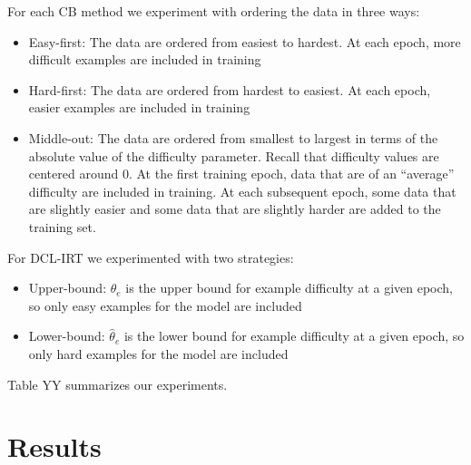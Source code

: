 \documentclass[letterpaper]{article} %
\begin{document}
For each CB method we experiment with ordering the data in three ways:
\begin{itemize}
	\item 
	Easy-first: The data are ordered from easiest to hardest. At each epoch, more difficult examples are included in training
	\item 
	Hard-first: The data are ordered from hardest to easiest. At each epoch, easier examples are included in training
	\item 
	Middle-out: The data are ordered from smallest to largest in terms of the absolute value of the difficulty parameter. Recall that difficulty values are centered around $0$. At the first training epoch, data that are of an ``average'' difficulty are included in training. At each subsequent epoch, some data that are slightly easier and some data that are slightly harder are added to the training set.
\end{itemize}
%
For DCL-IRT we experimented with two strategies:

\begin{itemize}
	\item 
	Upper-bound: $\hat{\theta}_e$ is the upper bound for example difficulty at a given epoch, so only easy examples for the model are included
	\item 
	Lower-bound: $\hat{\theta}_e$ is the lower bound for example difficulty at a given epoch, so only hard examples for the model are included
\end{itemize}

Table YY summarizes our experiments.


\section{Results} 
\end{document}
